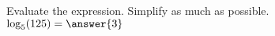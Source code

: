 \documentclass{ximera}
\author{David Kish}
\begin{document}
\begin{exercise}
Evaluate the expression. Simplify as much as possible.\\
$\log_5 (125) = \answer{3}$
\end{exercise}
\end{document}
